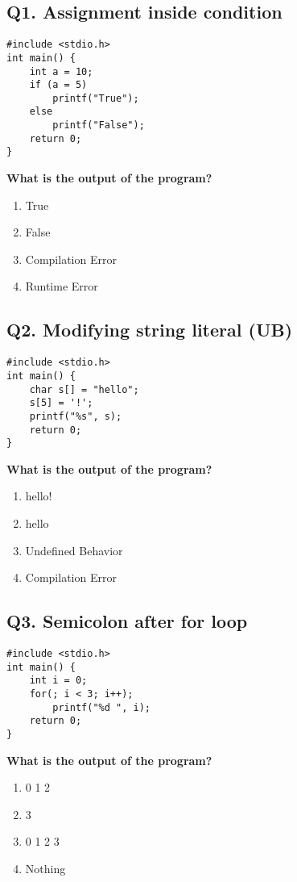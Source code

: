 \subsection*{Q1. Assignment inside condition}
\begin{verbatim}
#include <stdio.h>
int main() {
    int a = 10;
    if (a = 5)
        printf("True");
    else
        printf("False");
    return 0;
}
\end{verbatim}
\textbf{What is the output of the program?}

\begin{enumerate}[label=(\alph*)]
    \item True
    \item False
    \item Compilation Error
    \item Runtime Error
\end{enumerate}

\subsection*{Q2. Modifying string literal (UB)}
\begin{verbatim}
#include <stdio.h>
int main() {
    char s[] = "hello";
    s[5] = '!';
    printf("%s", s);
    return 0;
}
\end{verbatim}
\textbf{What is the output of the program?}

\begin{enumerate}[label=(\alph*)]
    \item hello!
    \item hello
    \item Undefined Behavior
    \item Compilation Error
\end{enumerate}

\subsection*{Q3. Semicolon after for loop}
\begin{verbatim}
#include <stdio.h>
int main() {
    int i = 0;
    for(; i < 3; i++);
        printf("%d ", i);
    return 0;
}
\end{verbatim}
\textbf{What is the output of the program?}

\begin{enumerate}[label=(\alph*)]
    \item 0 1 2 
    \item 3
    \item 0 1 2 3
    \item Nothing
\end{enumerate}

